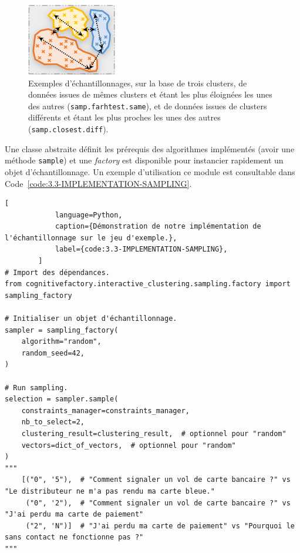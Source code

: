 		\begin{figure}[!htb]
			\centering
			\includegraphics[width=0.35\textwidth]{figures/example-sampling}
			\caption{Exemples d’échantillonnages, sur la base de trois clusters, de données issues de mêmes clusters et étant les plus éloignées les unes des autres (\texttt{samp.farhtest.same}), et de données issues de clusters différents et étant les plus proches les unes des autres (\texttt{samp.closest.diff}).}
			\label{figure:3.3-CONTRAINTES-SAMPLING}
		\end{figure}

		Une classe abstraite définit les prérequis des algorithmes implémentés (avoir une méthode \texttt{sample}) et une \textit{factory} est disponible pour instancier rapidement un objet d'échantillonnage.
		Un exemple d'utilisation ce module est consultable dans Code~\ref{code:3.3-IMPLEMENTATION-SAMPLING}.
		
		\begin{lstlisting}[
			language=Python,
			caption={Démonstration de notre implémentation de l'échantillonnage sur le jeu d'exemple.},
			label={code:3.3-IMPLEMENTATION-SAMPLING},
		]
# Import des dépendances.
from cognitivefactory.interactive_clustering.sampling.factory import sampling_factory

# Initialiser un objet d'échantillonnage.
sampler = sampling_factory(
	algorithm="random",
    random_seed=42,
)

# Run sampling.
selection = sampler.sample(
	constraints_manager=constraints_manager,
	nb_to_select=2,
	clustering_result=clustering_result,  # optionnel pour "random"
	vectors=dict_of_vectors,  # optionnel pour "random"
)
"""
	[("0", '5"),  # "Comment signaler un vol de carte bancaire ?" vs "Le distributeur ne m'a pas rendu ma carte bleue."
	 ("0", '2"),  # "Comment signaler un vol de carte bancaire ?" vs "J'ai perdu ma carte de paiement"
	 ("2", 'N")]  # "J'ai perdu ma carte de paiement" vs "Pourquoi le sans contact ne fonctionne pas ?"
"""
		\end{lstlisting}
		

